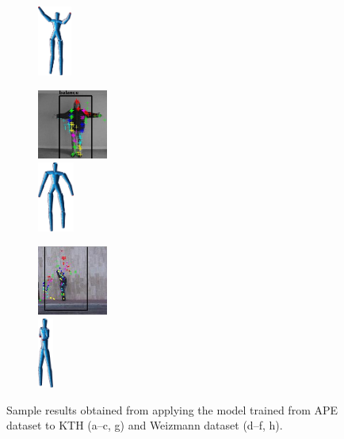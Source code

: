 \begin{figure}
\begin{subfigure}[t]{0.18\linewidth}
		\includegraphics[height=2.3cm]{fig/body/others/weiz2.png} 
		\label{fig/body/others/f}
	\end{subfigure}
	\begin{subfigure}[t]{0.18\linewidth} \centering
		\includegraphics[height=2.3cm]{fig/body/others/ktherr.jpg} \\
		\includegraphics[height=2.3cm]{fig/body/others/ktherr.png} 
		\label{fig/body/others/g}
	\end{subfigure}
	\begin{subfigure}[t]{0.18\linewidth} \centering
		\includegraphics[height=2.3cm]{fig/body/others/weizerr.jpg} \\
		\includegraphics[height=2.3cm]{fig/body/others/weizerr.png} 
		\label{fig/body/others/h}
	\end{subfigure}
	\caption{Sample results obtained from applying the model trained from APE dataset to KTH (a--c, g) and Weizmann dataset (d--f, h).} 
	\label{fig/body/otherresults}
\end{figure}

